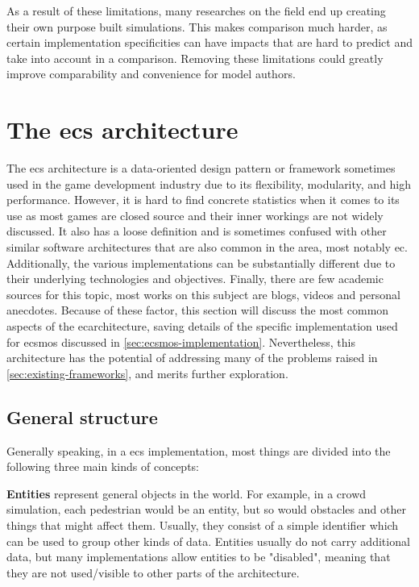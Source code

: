 \documentclass[twoside, 11pt]{article}
\begin{document}
As a result of these limitations, many researches on the field end up creating their own purpose built simulations. This makes comparison much harder, as certain implementation specificities can have impacts that are hard to predict and take into account in a comparison. Removing these limitations could greatly improve comparability and convenience for model authors.

\section{The \acrlong{ecs} architecture}

The \gls{ecs} architecture is a data-oriented design pattern or framework sometimes used in the game development industry due to its flexibility, modularity, and high performance. However, it is hard to find concrete statistics when it comes to its use as most games are closed source and their inner workings are not widely discussed. It also has a loose definition and is sometimes confused with other similar software architectures that are also common in the area, most notably \gls{ec}. Additionally, the various implementations can be substantially different due to their underlying technologies and objectives. Finally, there are few academic sources for this topic, most works on this subject are blogs, videos and personal anecdotes. Because of these factor, this section will discuss the most common aspects of the \gls{ec}architecture, saving details of the specific implementation used for \gls{ecsmos} discussed in \autoref{sec:ecsmos-implementation}. Nevertheless, this architecture has the potential of addressing many of the problems raised in \autoref{sec:existing-frameworks}, and merits further exploration.

\subsection{General structure}

Generally speaking, in a \gls{ecs} implementation, most things are divided into the following three main kinds of concepts: 

\textbf{Entities} represent general objects in the world. For example, in a crowd simulation, each pedestrian would be an entity, but so would obstacles and other things that might affect them. Usually, they consist of a simple identifier which can be used to group other kinds of data. Entities usually do not carry additional data, but many implementations allow entities to be "disabled", meaning that they are not used/visible to other parts of the architecture.
\end{document}
